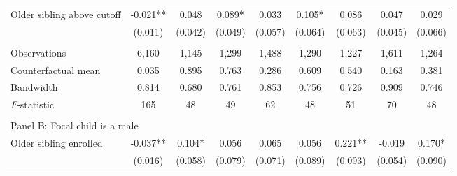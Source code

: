 \begin{table}[!htbp]
{{\begin{tabular}{lcccccccc}
Older sibling above cutoff&      -0.021** &       0.048   &       0.089*  &       0.033   &       0.105*  &       0.086   &       0.047   &       0.029   \\
                    &     (0.011)   &     (0.042)   &     (0.049)   &     (0.057)   &     (0.064)   &     (0.063)   &     (0.045)   &     (0.066)   \\
                    &               &               &               &               &               &               &               &               \\
Observations        &       6,160   &       1,145   &       1,299   &       1,488   &       1,290   &       1,227   &       1,611   &       1,264   \\
Counterfactual mean &       0.035   &       0.895   &       0.763   &       0.286   &       0.609   &       0.540   &       0.163   &       0.381   \\
Bandwidth           &       0.814   &       0.680   &       0.761   &       0.853   &       0.756   &       0.726   &       0.909   &       0.746   \\
\textit{F}-statistic&         165   &          48   &          49   &          62   &          48   &          51   &          70   &          48   \\
 
&  &  &  &  \\
\multicolumn{10}{l}{Panel B: Focal child is a male} \\
Older sibling enrolled&      -0.037** &       0.104*  &       0.056   &       0.065   &       0.056   &       0.221** &      -0.019   &       0.170*  \\
                    &     (0.016)   &     (0.058)   &     (0.079)   &     (0.071)   &     (0.089)   &     (0.093)   &     (0.054)   &     (0.090)   \\
 

\end{tabular}}}
\end{table}
